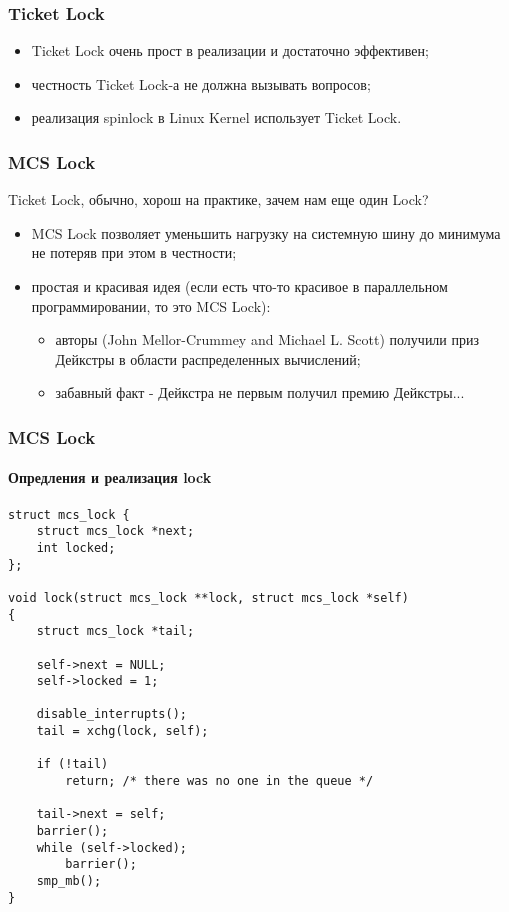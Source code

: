 \begin{frame}
\frametitle{Ticket Lock}

\begin{itemize}
  \item Ticket Lock очень прост в реализации и достаточно эффективен;
  \item честность Ticket Lock-а не должна вызывать вопросов;
  \item реализация spinlock в Linux Kernel использует Ticket Lock.
\end{itemize}
\end{frame}

\begin{frame}
\frametitle{MCS Lock}

Ticket Lock, обычно, хорош на практике, зачем нам еще один Lock?
\begin{itemize}
  \item<1-> MCS Lock позволяет уменьшить нагрузку на системную шину до минимума
        не потеряв при этом в честности;
  \item<2-> простая и красивая идея (если есть что-то красивое в параллельном
        программировании, то это MCS Lock):
        \begin{itemize}
          \item авторы (John Mellor-Crummey and Michael L. Scott) получили приз
                Дейкстры в области распределенных вычислений;
          \item забавный факт - Дейкстра не первым получил премию Дейкстры...
        \end{itemize}
\end{itemize}
\end{frame}

\begin{frame}[fragile]
\frametitle{MCS Lock}
\framesubtitle{Опредления и реализация lock}
\begin{lstlisting}
struct mcs_lock {
    struct mcs_lock *next;
    int locked;
};

void lock(struct mcs_lock **lock, struct mcs_lock *self)
{
    struct mcs_lock *tail;

    self->next = NULL;
    self->locked = 1;

    disable_interrupts();
    tail = xchg(lock, self);

    if (!tail)
        return; /* there was no one in the queue */

    tail->next = self;
    barrier();
    while (self->locked);
        barrier();
    smp_mb();
}
\end{lstlisting}
\end{frame}

